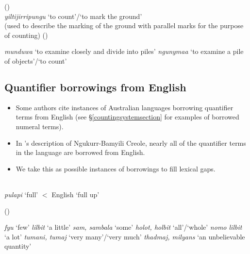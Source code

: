 \documentclass{article}
\begin{document}
\begin{exe}
 (\citealt[179]{pintupi77})\\
\textit{yiltijirripungu} `to count'/`to mark the ground'\\
(used to describe the marking of the ground with parallel marks for the purpose of counting)
 (\citealt{heath84})
\begin{xlist}
\ex \textit{munduwa} `to examine closely and divide into piles' 
\ex \textit{ngunymaa} `to examine a pile of objects'/`to count'
\end{xlist}
\end{exe} 

\subsection{Quantifier borrowings from English}

\begin{itemize}
\item Some authors cite instances of Australian languages borrowing quantifier terms from English (see \S\ref{countingsystemsection} for examples of borrowed numeral terms).
\item In \cite{sandefur79}'s description of Ngukurr-Bamyili Creole, nearly all of the quantifier terms in the language are borrowed from English.
\item We take this as possible instances of borrowings to fill lexical gaps.
\end{itemize}

\begin{exe} 
 \\
{\it pulapi} `full' $<$ English `full up'

 (\citealt[100]{sandefur79})
\begin{xlist}
\ex \textit{fyu} `few'
\ex \textit{lilbit} `a little'
\ex \textit{sam, sambala} `some'
\ex \textit{holot, holbit} `all'/`whole'
\ex \textit{nomo lilbit} `a lot'
\ex \textit{tumani, tumaj} `very many'/`very much'
\ex \textit{thadmaj, milyans} `an unbelievable quantity'
\end{xlist}
\end{exe}
\end{document}
